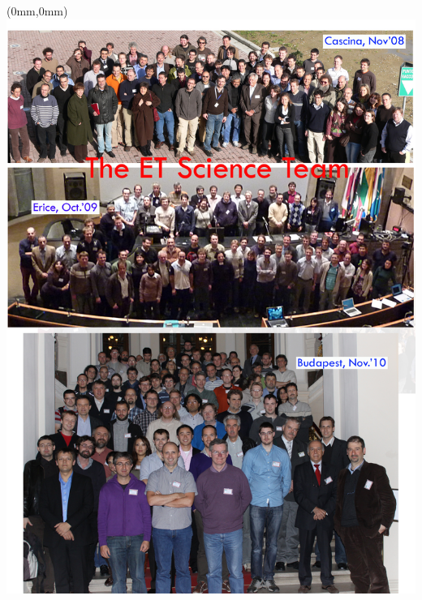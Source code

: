 \documentclass[color,DIV12,pdftex,a4paper]{ET-DS}
\begin{document}
\clearpage
\listoffigures
\clearpage
\listoftables
\clearpage
{}
\newpage

\printnomenclature[0.75in] 
\newpage

\newpage 
%
\FloatBarrier
%
%
\pagestyle{empty}
\begin{textblock*}{297mm}(0mm,0mm)   \includegraphics[width=\paperwidth]{TheETscienceTeam.jpg}
\end{textblock*}
\newpage
\end{document}
